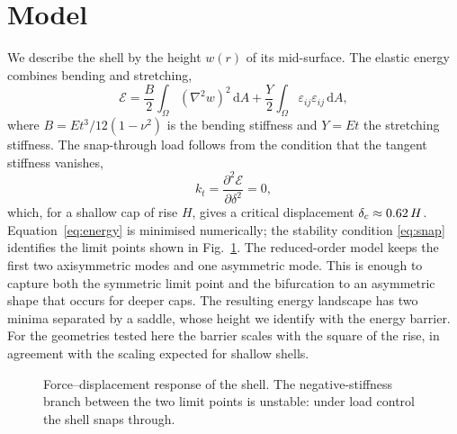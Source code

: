 \documentclass[10pt,twocolumn]{article}
\newcommand{\rev}[2]{\ifdefined\revised #2\else #1\fi}
\begin{document}
\section{Model}
We describe the shell by the height $w(r)$ of its mid-surface. The elastic
energy combines bending and stretching,
\begin{equation}
  \mathcal{E} = \frac{B}{2}\int_\Omega (\nabla^2 w)^2\,\mathrm{d}A
  + \frac{Y}{2}\int_\Omega \varepsilon_{ij}\varepsilon_{ij}\,\mathrm{d}A ,
  \label{eq:energy}
\end{equation}
where $B = E t^3/12(1-\nu^2)$ is the bending stiffness and $Y = E t$ the
stretching stiffness. The snap-through load follows from the condition that
the tangent stiffness vanishes,
\begin{equation}
  k_t = \frac{\partial^2 \mathcal{E}}{\partial \delta^2} = 0 ,
  \label{eq:snap}
\end{equation}
which, for a shallow cap of rise $H$, gives a critical displacement
$\delta_c \approx \rev{0.62}{0.58}\,H$. Equation~\eqref{eq:energy} is minimised
numerically; the stability condition \eqref{eq:snap} identifies the limit
points shown in Fig.~\ref{fig:curve}.
The reduced-order model keeps the first two axisymmetric modes and one asymmetric mode. This is enough to capture both the symmetric limit point and the bifurcation to an asymmetric shape that occurs for deeper caps. The resulting energy landscape has two minima separated by a saddle, whose height we identify with the energy barrier. For the geometries tested here the barrier scales with the square of the rise, in agreement with the scaling expected for shallow shells.

\begin{figure}[t]
\centering
{}
\caption{Force--displacement response of the shell. The negative-stiffness
branch between the two limit points is unstable: under load control the shell
snaps through.}
\label{fig:curve}
\end{figure}
\end{document}
